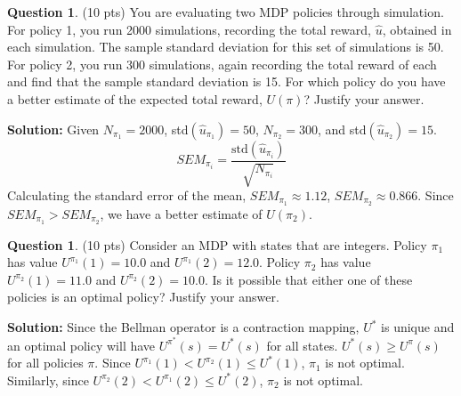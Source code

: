 \documentclass{article}
\theoremstyle{definition}
\newtheorem{question}[thm]{Question}
\begin{document}
\begin{question} (10 pts)
You are evaluating two MDP policies through simulation. For policy 1, you run 2000 simulations, recording the total reward, $\hat{u}$, obtained in each simulation. The sample standard deviation for this set of simulations is 50. For policy 2, you run 300 simulations, again recording the total reward of each and find that the sample standard deviation is 15. For which policy do you have a better estimate of the expected total reward, $U(\pi)$? Justify your answer.
\end{question} 
\noindent \textbf{Solution: }
Given $N_{\pi_1} = 2000$, std$(\hat{u}_{\pi_1}) = 50$, $N_{\pi_2} = 300$, and std$(\hat{u}_{\pi_2}) = 15$.
\begin{equation*}
    SEM_{\pi_i} = \frac{\text{std}(\hat{u}_{\pi_i})}{\sqrt{N_{\pi_i}}}
\end{equation*}
Calculating the standard error of the mean, $SEM_{\pi_1} \approx 1.12$, $SEM_{\pi_2} \approx 0.866$. Since $SEM_{\pi_1} > SEM_{\pi_2}$, we have a better estimate of $\boxed{U(\pi_2)}$.

\vspace{10cm}

\begin{question} (10 pts)
Consider an MDP with states that are integers. Policy $\pi_1$ has value $U^{\pi_1}(1) = 10.0$ and $U^{\pi_1}(2) = 12.0$. Policy $\pi_2$ has value $U^{\pi_2}(1) = 11.0$ and $U^{\pi_2}(2) = 10.0$. Is it possible that either one of these policies is an optimal policy? Justify your answer.
\end{question}
\noindent \textbf{Solution: }
Since the Bellman operator is a contraction mapping, $U^*$ is unique and an optimal policy will have $U^{\pi^*}(s) = U^*(s)$ for all states. $U^*(s) \geq U^\pi(s)$ for all policies $\pi$. Since $U^{\pi_1}(1) < U^{\pi_2}(1) \leq U^*(1)$, $\pi_1$ is not optimal. Similarly, since $U^{\pi_2}(2) < U^{\pi_1}(2) \leq U^*(2)$, $\pi_2$ is not optimal.
\end{document}
